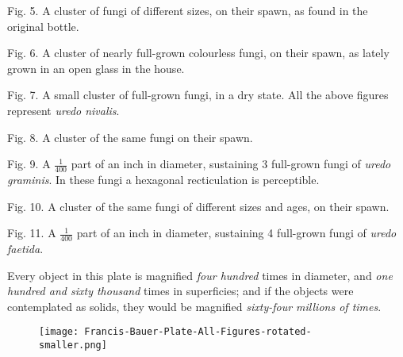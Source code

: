 \documentclass[a4paper, 12pt, oneside]{article}
\begin{document}
Fig. 5. A cluster of fungi of different sizes, on their spawn, as found in the original bottle.

Fig. 6. A cluster of nearly full-grown colourless fungi, on their spawn, as lately grown in an open glass in the house.

Fig. 7. A small cluster of full-grown fungi, in a dry state. All the above figures represent \emph{uredo nivalis}.

Fig. 8. A cluster of the same fungi on their spawn.

Fig. 9. A $\frac{1}{400}$ part of an inch in diameter, sustaining 3 full-grown fungi of \emph{uredo graminis}. In these fungi a hexagonal recticulation is perceptible.

Fig. 10. A cluster of the same fungi of different sizes and ages, on their spawn.

Fig. 11. A $\frac{1}{400}$ part of an inch in diameter, sustaining 4 full-grown fungi of \emph{uredo faetida}.

Every object in this plate is magnified \emph{four hundred} times in diameter, and \emph{one hundred and sixty thousand} times in superficies; and if the objects were contemplated as solids, they would be magnified \emph{sixty-four millions of times}.
\clearpage

\begin{figure}[b]
\texttt{[image: Francis-Bauer-Plate-All-Figures-rotated-smaller.png]}
\centering
\end{figure}
\clearpage
\end{document}
